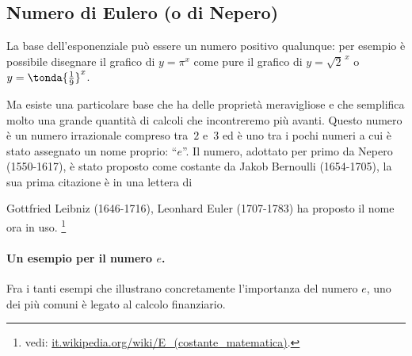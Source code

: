 \subsection{Numero di Eulero (o di Nepero)}
\label{subsec:esplog_eulero}

\noindent\begin{minipage}{.48\textwidth}
La base dell'esponenziale può essere un numero positivo qualunque: per 
esempio è possibile disegnare il grafico di \(y=\pi^x\)
come pure il grafico di \(y = \sqrt{2}^{\,x}\) o 
\(y = \tonda{\frac{1}{9}}^{x}\). 

Ma esiste una particolare base che ha delle proprietà meravigliose e che 
semplifica molto una grande quantità di calcoli che incontreremo più avanti.
Questo numero è un numero irrazionale compreso tra~\(2\) e~\(3\) ed è uno 
tra i pochi numeri a cui è stato assegnato un nome proprio: ``\(e\)''.
Il numero, adottato per primo da Nepero (1550-1617), è stato proposto come 
costante da Jakob Bernoulli (1654-1705), la sua prima citazione è in una 
lettera di
\end{minipage}
\hfill
\begin{minipage}{.48\textwidth}
\begin{center} \altrebasi \end{center}
\end{minipage}

\noindent Gottfried Leibniz (1646-1716), Leonhard Euler (1707-1783) ha 
proposto il nome ora in uso.
\footnote{vedi: 
\href{https://it.wikipedia.org/wiki/E\_(costante\_matematica)}
     {it.wikipedia.org/wiki/E\_(costante\_matematica)}. 
}

\paragraph{Un esempio per il numero \(e\).}

Fra i tanti esempi che illustrano concretamente l'importanza del numero 
\(e\), uno dei più comuni è legato al calcolo finanziario.

